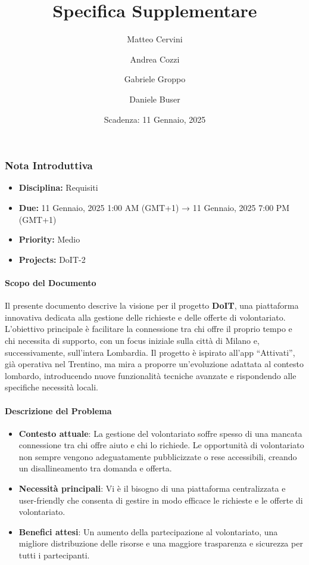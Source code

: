 \title{Specifica Supplementare}
\author{Matteo Cervini \and Andrea Cozzi \and Gabriele Groppo \and Daniele Buser}
\date{Scadenza: 11 Gennaio, 2025}

\maketitle

\subsubsection{Nota Introduttiva}
\begin{itemize}
\item \textbf{Disciplina:} Requisiti
\item \textbf{Due:} 11 Gennaio, 2025 1:00 AM (GMT+1) → 11 Gennaio, 2025 7:00 PM (GMT+1)
\item \textbf{Priority:} Medio
\item \textbf{Projects:} DoIT-2
\end{itemize}

\paragraph{Scopo del Documento}
Il presente documento descrive la visione per il progetto \textbf{DoIT}, una piattaforma innovativa dedicata alla gestione delle richieste e delle offerte di volontariato. L'obiettivo principale è facilitare la connessione tra chi offre il proprio tempo e chi necessita di supporto, con un focus iniziale sulla città di Milano e, successivamente, sull'intera Lombardia. Il progetto è ispirato all'app ``Attivati'', già operativa nel Trentino, ma mira a proporre un'evoluzione adattata al contesto lombardo, introducendo nuove funzionalità tecniche avanzate e rispondendo alle specifiche necessità locali.

\paragraph{Descrizione del Problema}
\begin{itemize}
\item \textbf{Contesto attuale}: La gestione del volontariato soffre spesso di una mancata connessione tra chi offre aiuto e chi lo richiede. Le opportunità di volontariato non sempre vengono adeguatamente pubblicizzate o rese accessibili, creando un disallineamento tra domanda e offerta.
\item \textbf{Necessità principali}: Vi è il bisogno di una piattaforma centralizzata e user-friendly che consenta di gestire in modo efficace le richieste e le offerte di volontariato.
\item \textbf{Benefici attesi}: Un aumento della partecipazione al volontariato, una migliore distribuzione delle risorse e una maggiore trasparenza e sicurezza per tutti i partecipanti.
\end{itemize}

